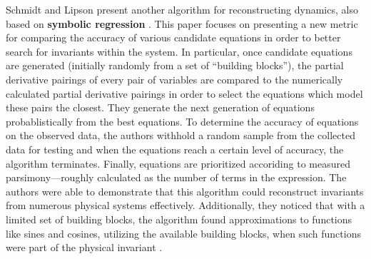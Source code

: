 \documentclass[10pt]{paper}
\begin{document}
Schmidt and Lipson present another algorithm for reconstructing dynamics, also based on \textbf{symbolic regression} \cite{schmidt}. 
This paper focuses on presenting a new metric for comparing the accuracy of various candidate equations in order to better search for invariants within the system. 
In particular, once candidate equations are generated (initially randomly from a set of ``building blocks''), the partial derivative pairings of every pair of variables are compared to the numerically calculated 
partial derivative pairings in order to select the equations which model these pairs the closest. They generate the next generation of equations probablistically from the best equations.
To determine the accuracy of equations on the observed data, the authors withhold a random sample from the collected data for testing and when the equations reach a certain level of accuracy, the algorithm terminates.
Finally, equations are prioritized accoriding to measured parsimony---roughly calculated as the number of terms in the expression. 
The authors were able to demonstrate that this algorithm could reconstruct invariants from numerous physical systems effectively. Additionally, they noticed that with a limited set of building blocks, the algorithm found approximations to functions like sines and cosines, utilizing the available building blocks, when such functions were part of the physical invariant \cite{schmidt}. 


\end{document}
